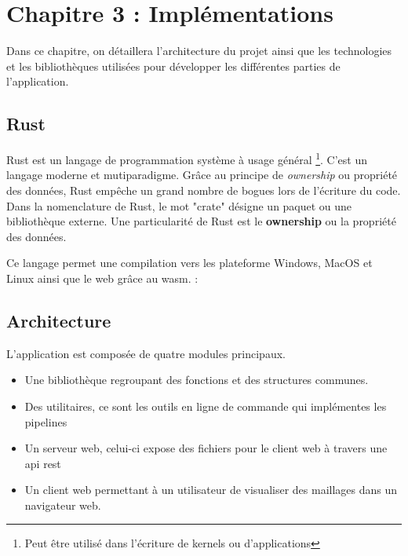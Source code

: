\chapter{Chapitre 3 : Implémentations}

Dans ce chapitre, on détaillera l'architecture du projet 
ainsi que les technologies et les bibliothèques utilisées
pour développer les différentes parties de l'application.


\section{Rust}

Rust est un langage de programmation système à usage général \footnote{Peut être
utilisé dans l'écriture de kernels ou d'applications}. C'est un langage moderne
et mutiparadigme.
Grâce au principe de \textit{ownership} ou propriété des données, Rust empêche un grand nombre de
bogues lors de l'écriture du code. 
Dans la nomenclature de Rust, le mot "crate" désigne un paquet ou une bibliothèque
externe.
Une particularité de Rust est le \textbf{ownership} ou la propriété des données.

Ce langage permet une compilation vers les plateforme Windows, MacOS et Linux
ainsi que le web grâce au \gls{wasm}. : 

\section{Architecture}

L'application est composée de quatre modules principaux.

\begin{itemize}
	\item Une bibliothèque regroupant des fonctions et des structures communes.
	\item Des utilitaires, ce sont les outils en ligne de commande qui
		implémentes les pipelines 
	\item Un serveur web, celui-ci expose des fichiers pour le client web à
		travers une api \gls{rest}
	\item Un client web permettant à un utilisateur de visualiser des maillages
		dans un navigateur web.
\end{itemize}

